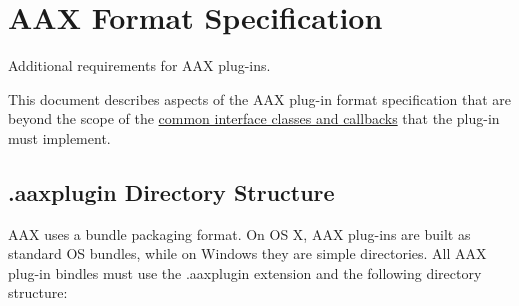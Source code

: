 \hypertarget{a00331}{}\section{A\+A\+X Format Specification}
\label{a00331}
Additional requirements for A\+A\+X plug-\/ins. 

This document describes aspects of the A\+A\+X plug-\/in format specification that are beyond the scope of the \hyperlink{a00325}{common interface classes and callbacks} that the plug-\/in must implement.

 \hypertarget{a00331_commoninterface_formatspecification__aaxplugin_directory_structure}{}\subsection{.\+aaxplugin Directory Structure}\label{a00331_commoninterface_formatspecification__aaxplugin_directory_structure}
A\+A\+X uses a bundle packaging format. On O\+S X, A\+A\+X plug-\/ins are built as standard O\+S bundles, while on Windows they are simple directories. All A\+A\+X plug-\/in bindles must use the .aaxplugin extension and the following directory structure\+:


